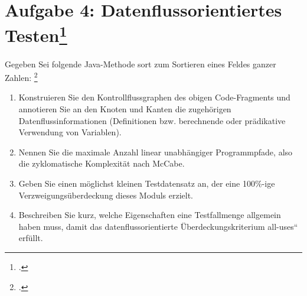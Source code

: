 \documentclass{lehramt-informatik-minimal}
\begin{document}
\section{Aufgabe 4: Datenflussorientiertes Testen\footcite{sosy:ab:7}}

Gegeben Sei folgende Java-Methode sort zum Sortieren eines Feldes ganzer
Zahlen:
\footcite[Herbst 2016 (66116) - Thema 1 Teilaufgabe 2, Aufgabe 3 a-e]{examen:66116:2016:09}


\begin{enumerate}


\item Konstruieren Sie den Kontrollflussgraphen des obigen
Code-Fragments und annotieren Sie an den Knoten und Kanten die
zugehörigen Datenflussinformationen (Definitionen bzw. berechnende
oder prädikative Verwendung von Variablen).


\item Nennen Sie die maximale Anzahl linear unabhängiger Programmpfade,
also die zyklomatische Komplexität nach McCabe.


\item Geben Sie einen möglichst kleinen Testdatensatz an, der eine
100\%-ige Verzweigungsüberdeckung dieses Moduls erzielt.


\item Beschreiben Sie kurz, welche Eigenschaften eine Testfallmenge
allgemein haben muss, damit das datenflussorientierte
Überdeckungskriterium all-uses“ erfüllt.

\end{enumerate}
\end{document}
